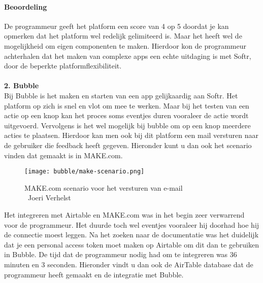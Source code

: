 \paragraph*{Beoordeling}
De programmeur geeft het platform een score van 4 op 5 doordat je kan opmerken dat het platform wel redelijk gelimiteerd is. Maar het heeft wel de mogelijkheid om eigen componenten te maken. 
Hierdoor kon de programmeur achterhalen dat het maken van complexe apps een echte uitdaging is met Softr, 
door de beperkte platformflexibiliteit.
\\
\\
\textbf{2. Bubble}
\\
Bij Bubble is het maken en starten van een app gelijkaardig aan Softr. Het platform op zich is snel en vlot om mee te werken. Maar bij het testen van een actie op een knop
kan het proces soms eventjes duren vooraleer de actie wordt uitgevoerd. Vervolgens is het wel mogelijk bij bubble om op een knop meerdere acties te plaatsen. Hierdoor kan men ook 
bij dit platform een mail versturen naar de gebruiker die feedback heeft gegeven. Hieronder kunt u dan ook het scenario vinden dat gemaakt is in MAKE.com.
\\
\begin{figure}[H]
    \texttt{[image: bubble/make-scenario.png]}
    \caption[MAKE.com scenario voor het versturen van e-mail]{MAKE.com scenario voor het versturen van e-mail\\\textcopyright\ Joeri Verhelst}
    \label{fig:make-scenario-bubble}
\end{figure}
Het integreren met Airtable en MAKE.com was in het begin zeer verwarrend voor de programmeur. Het duurde toch wel eventjes vooraleer hij doorhad hoe hij de connectie moest leggen.
Na het zoeken naar de documentatie was het duidelijk dat je een personal access token moet maken op Airtable om dit dan te gebruiken in Bubble. De tijd dat de programmeur nodig had 
om te integreren was 36 minuten en 3 seconden. Hieronder vindt u dan ook de AirTable database dat de programmeur heeft gemaakt en de integratie met Bubble.
\\
\\


